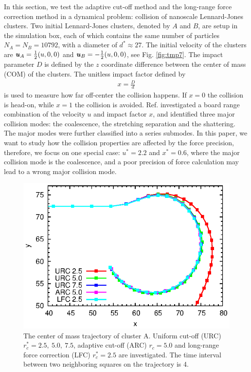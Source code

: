 \documentclass[aps,pre,preprint]{revtex4-1}
\renewcommand{\v}[1]{\textbf{\textit{#1}}}
\begin{document}
In this section, we test the adaptive cut-off method and the long-range force
correction method in a dynamical problem: collision of nanoscale
Lennard-Jones clusters. Two initial Lennard-Jones clusters, denoted by
$A$ and $B$, are setup in the simulation box, each of which contains
the same number of particles $N_A = N_B = 10792$, with a diameter of
$d^\ast\approx 27$. The initial velocity of the clusters are $\v u_A =
\frac12(u, 0, 0)$ and $\v u_B = -\frac12(u, 0, 0)$, see
Fig. \ref{fig:tmp7}. The impact parameter $D$ is defined by the $z$
coordinate difference between the center of mass (COM) of the
clusters. The unitless impact factor defined by
\begin{align}
  x = \frac D d
\end{align}
is used to measure how far off-center the collision happens. If $x =
0$ the collision is head-on, while $x=1$ the collision is avoided.
Ref. \cite{kalweit2006collision} investigated a board range
combination of the velocity $u$ and impact factor $x$, and identified
three major collision modes: the coalescence, the stretching separation
and the shattering. The major modes were further classified into a
series submodes. In this paper, we want to study how the collision
properties are affected by the force 
precision, therefore, we focus on one special case: $u^\ast = 2.2$ and
$x^\ast = 0.6$, where the major collision mode is the coalescence, and a
poor precision of force calculation may lead to a wrong major
collision mode.

\begin{figure}
  \centering
  \includegraphics[]{fig/trajs.eps}
  \caption{The center of mass trajectory of cluster A. Uniform cut-off
    (URC) $r_c^\ast = 2.5,\ 5.0,\ 7.5$, adaptive cut-off (ARC) $r_c =
    5.0$ and long-range force correction (LFC) $r^\ast_c = 2.5$ are
    investigated.  The time interval between two neighboring squares
    on the trajectory is 4.  }
  \label{fig:tmp8}
\end{figure}
\end{document}
